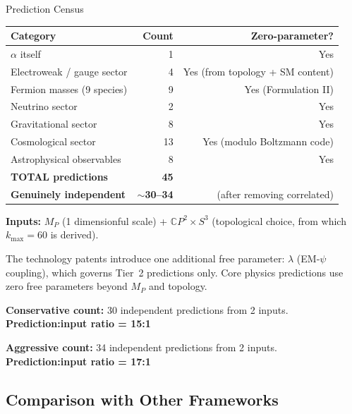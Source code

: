 \documentclass[12pt,a4paper]{article}
\newcommand{\CP}{\mathbb{C}P}
\begin{document}
\begin{countbox}{Prediction Census}
\begin{center}
\renewcommand{\arraystretch}{1.3}
\begin{tabular}{lrr}
\toprule
\textbf{Category} & \textbf{Count} & \textbf{Zero-parameter?} \\
\midrule
$\alpha$ itself                          & 1  & Yes \\
Electroweak / gauge sector               & 4  & Yes (from topology + SM content) \\
Fermion masses (9 species)               & 9  & Yes (Formulation II) \\
Neutrino sector                          & 2  & Yes \\
Gravitational sector                     & 8  & Yes \\
Cosmological sector                      & 13 & Yes (modulo Boltzmann code) \\
Astrophysical observables                & 8  & Yes \\
\midrule
\textbf{TOTAL predictions}               & \textbf{45} & \\
\textbf{Genuinely independent}           & \textbf{$\sim$30--34} & (after removing correlated) \\
\bottomrule
\end{tabular}
\end{center}

\medskip
\textbf{Inputs:} $M_P$ (1 dimensionful scale) + $\CP^2 \times S^3$
(topological choice, from which $k_{\max} = 60$ is derived).

The technology patents introduce one additional free parameter:
$\lambda$ (EM-$\psi$ coupling), which governs Tier~2 predictions only.
Core physics predictions use zero free parameters beyond $M_P$ and topology.

\medskip
\textbf{Conservative count:} 30 independent predictions from 2 inputs.\\
\textbf{Prediction:input ratio = 15:1}

\medskip
\textbf{Aggressive count:} 34 independent predictions from 2 inputs.\\
\textbf{Prediction:input ratio = 17:1}
\end{countbox}

\subsection{Comparison with Other Frameworks}
\end{document}
